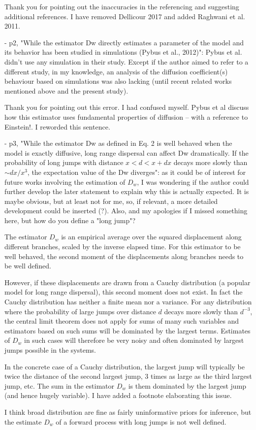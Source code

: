\documentclass[11pt, oneside]{article}   	%
\newcommand{\response}[1]{{\color{black}{\bf Response:} #1}}
\begin{document}
\response{Thank you for pointing out the inaccuracies in the referencing and suggesting additional references. I have removed Dellicour 2017 and added Raghwani et al. 2011.}


- p2, "While the estimator Dw directly estimates a parameter of the model and its behavior has been studied in simulations (Pybus et al., 2012)": Pybus et al. didn't use any simulation in their study. Except if the author aimed to refer to a different study, in my knowledge, an analysis of the diffusion coefficient(s) behaviour based on simulations was also lacking (until recent related works mentioned above and the present study).

\response{Thank you for pointing out this error. I had confused myself. Pybus et al discuss how this estimator uses fundamental properties of diffusion -- with a reference to Einstein!. I reworded this sentence.}


- p3, "While the estimator Dw as defined in Eq. 2 is well behaved when the model is exactly diffusive, long range dispersal can affect Dw dramatically. If the probability of long jumps with distance $x < d < x+dx$ decays more slowly than $\sim dx/x^3$, the expectation value of the Dw diverges": as it could be of interest for future works involving the estimation of $D_w$, I was wondering if the author could further develop the later statement to explain why this is actually expected. It is maybe obvious, but at least not for me, so, if relevant, a more detailed development could be inserted (?). Also, and my apologies if I missed something here, but how do you define a "long jump"?

\response{
The estimator $D_w$ is an empirical average over the squared displacement along different branches, scaled by the inverse elapsed time.
For this estimator to be well behaved, the second moment of the displacements along branches needs to be well defined.

However, if these displacements are drawn from a Cauchy distribution  (a popular model for long range dispersal), this second moment does not exist. In fact the Cauchy distribution has neither a finite mean nor a variance. For any distribution where the probability of large jumps over distance $d$ decays more slowly than $d^{-3}$, the central limit theorem does not apply for sums of many such variables and estimators based on such sums will be dominated by the largest terms. Estimates of $D_w$ in such cases will therefore be very noisy and often dominated by largest jumps possible in the systems.

In the concrete case of a Cauchy distribution, the largest jump will typically be twice the distance of the second largest jump, 3 times as large as the third largest jump, etc. The sum in the estimator $D_w$ is them dominated by the largest jump (and hence hugely variable).
I have added a footnote elaborating this issue.

I think broad distribution are fine as fairly uninformative priors for inference, but the estimate $D_w$ of a forward process with long jumps is not well defined.

}
\end{document}
